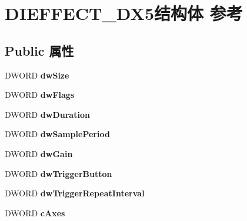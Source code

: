 \hypertarget{struct_d_i_e_f_f_e_c_t___d_x5}{}\section{D\+I\+E\+F\+F\+E\+C\+T\+\_\+\+D\+X5结构体 参考}
\label{struct_d_i_e_f_f_e_c_t___d_x5}
\subsection*{Public 属性}
\begin{DoxyCompactItemize}
\item 
\mbox{\label{struct_d_i_e_f_f_e_c_t___d_x5_aa8bf9ca3741b7dc6025da3d967ae6b8e}} 
D\+W\+O\+RD {\bfseries dw\+Size}
\item 
\mbox{\label{struct_d_i_e_f_f_e_c_t___d_x5_a9f6a7f7146984a5232c6774a5bda2969}} 
D\+W\+O\+RD {\bfseries dw\+Flags}
\item 
\mbox{\label{struct_d_i_e_f_f_e_c_t___d_x5_a70a1e5ac269503626dd27ce60f5a8456}} 
D\+W\+O\+RD {\bfseries dw\+Duration}
\item 
\mbox{\label{struct_d_i_e_f_f_e_c_t___d_x5_a89dbae8bde71041396a0bc03e3073773}} 
D\+W\+O\+RD {\bfseries dw\+Sample\+Period}
\item 
\mbox{\label{struct_d_i_e_f_f_e_c_t___d_x5_a4efb926bff40128a17083cbf0831d340}} 
D\+W\+O\+RD {\bfseries dw\+Gain}
\item 
\mbox{\label{struct_d_i_e_f_f_e_c_t___d_x5_aa876bea2a0532f6dfb64fca56b9ab50c}} 
D\+W\+O\+RD {\bfseries dw\+Trigger\+Button}
\item 
\mbox{\label{struct_d_i_e_f_f_e_c_t___d_x5_ad9d298dfe6c5eec890d05dae842e2615}} 
D\+W\+O\+RD {\bfseries dw\+Trigger\+Repeat\+Interval}
\item 
\mbox{\label{struct_d_i_e_f_f_e_c_t___d_x5_a04c00e83549c49f92c375d4c1d80d412}} 
D\+W\+O\+RD {\bfseries c\+Axes}
\item 

\end{DoxyCompactItemize}
